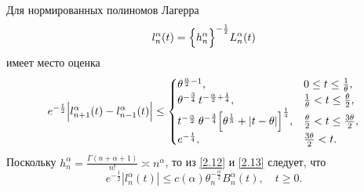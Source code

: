 Для нормированных полиномов Лагерра
\begin{equation}\label{2.13}
l_n^\alpha(t)=
\Bigl\{h_n^\alpha \Bigr\}^{-\frac{1}{2}} L_n^\alpha(t)
\end{equation}
имеет место оценка \cite{AskeyWaiger}
\begin{equation}\label{2.14}
e^{-\frac{t}{2}}
\Bigl|
l_{n+1}^\alpha(t)-
l_{n-1}^\alpha(t)
\Bigr|\le
\begin{cases}
\theta^{\frac{\alpha}{2}-1}, &0 \le t \le \frac{1}{\theta},\\
\theta^{-\frac{3}{4}}\,t^{-\frac{\alpha}{2} + \frac{1}{4}}, & \frac{1}{\theta} < t \le \frac{\theta}{2},\\
t^{-\frac{\alpha}{2}}\,
\theta^{-\frac{3}{4}}
\Bigl[
\theta^{\frac{1}{3}}+|t-\theta|
\Bigr]^{\frac{1}{4}}, & \frac{\theta}{2} < t \le \frac{3\theta}{2},\\
e^{-\frac{t}{4}}, &\frac{3\theta}{2}< t.
\end{cases}
\end{equation}
Поскольку $h_n^\alpha=\frac{\Gamma(n+\alpha+1)}{n!} \asymp n^\alpha$, то из \eqref{2.12} и \eqref{2.13} следует, что
\begin{equation}\label{2.15}
e^{-\frac{t}{2}}
|l_n^\alpha(t)|\le
c(\alpha)\theta_n^{-\frac{\alpha}{2}}B_n^\alpha(t), \quad t \ge 0.
\end{equation}



